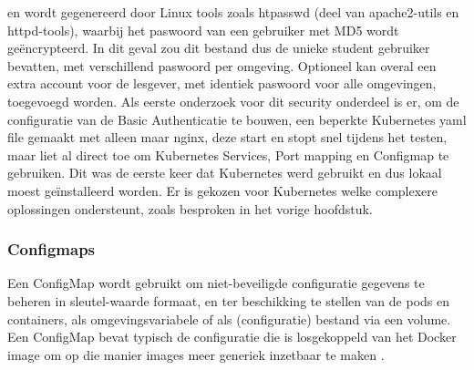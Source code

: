 en wordt gegenereerd door Linux tools zoals htpasswd (deel van apache2-utils en httpd-tools), waarbij het paswoord van een gebruiker met MD5 wordt geëncrypteerd. In dit geval zou dit bestand dus de unieke student gebruiker bevatten, met verschillend paswoord per omgeving.
Optioneel kan overal een extra account voor de lesgever, met identiek paswoord voor alle omgevingen, toegevoegd worden.
\newline
\newline
Als eerste onderzoek voor dit security onderdeel is er, om de configuratie van de Basic Authenticatie te bouwen, een beperkte Kubernetes yaml file gemaakt met alleen maar nginx, deze start en stopt snel tijdens het testen, maar liet al direct toe om Kubernetes Services, Port mapping en Configmap te gebruiken. Dit was de eerste keer dat Kubernetes werd gebruikt en dus lokaal moest geïnstalleerd worden.
\newline
Er is gekozen voor Kubernetes welke complexere oplossingen ondersteunt, zoals besproken in het vorige hoofdstuk.
\newline
\newline
\subsubsection{Configmaps} 
\autocite{Kubernetes2023}
\newline
Een ConfigMap wordt gebruikt om niet-beveiligde configuratie gegevens te beheren in sleutel-waarde formaat, en ter beschikking te stellen van de pods en containers, als omgevingsvariabele of als (configuratie) bestand via een volume.
Een ConfigMap bevat typisch de configuratie die is losgekoppeld van het Docker image om op die manier images meer generiek inzetbaar te maken \textcite{Kubernetes2023}.


